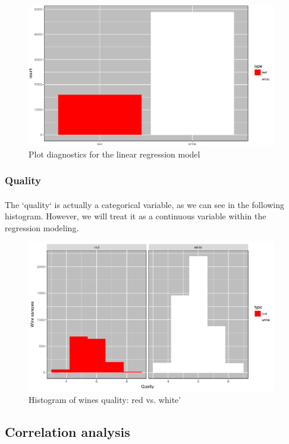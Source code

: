 \documentclass[10pt]{article}
\begin{document}
\begin{figure}[H]
	\centering
	\includegraphics[width=4.3in]{figures/type-distribution.png}
	\caption{Plot diagnostics for the linear regression model} 
	\label{figure:type}
\end{figure}

\subsubsection{Quality}
\paragraph*{}
The `quality` is actually a categorical variable, as we can see in the following histogram. However, we will treat it as a continuous variable within the regression modeling.

\begin{figure}[H]
	\centering
	\includegraphics[width=4.3in]{figures/quality-distribution.png}
	\caption{Histogram of wines quality: red vs. white'} 
	\label{figure:quality}
\end{figure}

\subsection{Correlation analysis}
\end{document}
